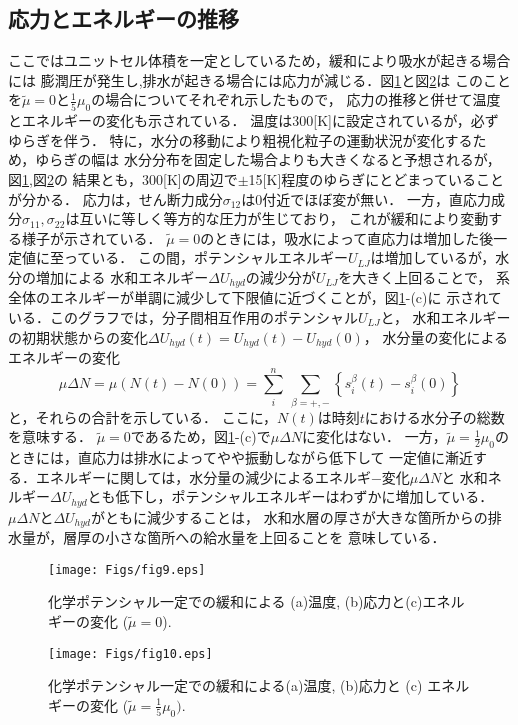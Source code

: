 \subsection{応力とエネルギーの推移}
ここではユニットセル体積を一定としているため，緩和により吸水が起きる場合には
膨潤圧が発生し,排水が起きる場合には応力が減じる．図\ref{fig:fig9}と図\ref{fig:fig10}は
このことを$\tilde \mu=0$と$\frac{1}{5}\mu_0$の場合についてそれぞれ示したもので，
応力の推移と併せて温度とエネルギーの変化も示されている．
温度は300[K]に設定されているが，必ずゆらぎを伴う．
特に，水分の移動により粗視化粒子の運動状況が変化するため，ゆらぎの幅は
水分分布を固定した場合よりも大きくなると予想されるが，図\ref{fig:fig9},図\ref{fig:fig10}の
結果とも，300[K]の周辺で$\pm$15[K]程度のゆらぎにとどまっていることが分かる．
応力は，せん断力成分$\sigma_{12}$は0付近でほぼ変が無い．
一方，直応力成分$\sigma_{11},\sigma_{22}$は互いに等しく等方的な圧力が生じており，
これが緩和により変動する様子が示されている．
$\tilde \mu=0$のときには，吸水によって直応力は増加した後一定値に至っている．
この間，ポテンシャルエネルギー$U_{LJ}$は増加しているが，水分の増加による
水和エネルギー$\Delta U_{hyd}$の減少分が$U_{LJ}$を大きく上回ることで，
系全体のエネルギーが単調に減少して下限値に近づくことが，図\ref{fig:fig9}-(c)に
示されている．このグラフでは，分子間相互作用のポテンシャル$U_{LJ}$と，
水和エネルギーの初期状態からの変化$\Delta U_{hyd}(t)=U_{hyd}(t)-U_{hyd}(0)$，
水分量の変化によるエネルギーの変化
\begin{equation}
	\mu \Delta N= \mu \left(N(t)-N(0) \right) 
	= \sum_i^n\ \sum_{\beta=+,-}\left\{ s_i^\beta(t)-s_i^\beta(0) \right\}
	\label{eqn:mu_dN}
\end{equation}
と，それらの合計を示している．
ここに，$N(t)$は時刻$t$における水分子の総数を意味する．
$\tilde \mu=0$であるため，図\ref{fig:fig9}-(c)で$\mu \Delta N$に変化はない．
%
一方，$\tilde \mu =\frac{1}{2}\mu_0$のときには，直応力は排水によってやや振動しながら低下して
一定値に漸近する．エネルギーに関しては，水分量の減少によるエネルギ−変化$\mu \Delta N$と
水和ネルギー$\Delta U_{hyd}$とも低下し，ポテンシャルエネルギーはわずかに増加している．
$\mu \Delta N$と$\Delta U_{hyd}$がともに減少することは，
水和水層の厚さが大きな箇所からの排水量が，層厚の小さな箇所への給水量を上回ることを
意味している．
\begin{figure}[h]
	\begin{center}
	\texttt{[image: Figs/fig9.eps]} 
	\end{center}
	\caption{
		化学ポテンシャル一定での緩和による
		(a)温度, (b)応力と(c)エネルギーの変化 ($\tilde \mu=0$).
	} 
	\label{fig:fig9}
\end{figure}
\begin{figure}[h]
	\begin{center}
	\texttt{[image: Figs/fig10.eps]} 
	\end{center}
	\caption{
		化学ポテンシャル一定での緩和による(a)温度, (b)応力と (c) エネルギーの変化
		($\tilde \mu =\frac{1}{5}\mu_0).$
	} 
	\label{fig:fig10}
\end{figure}

